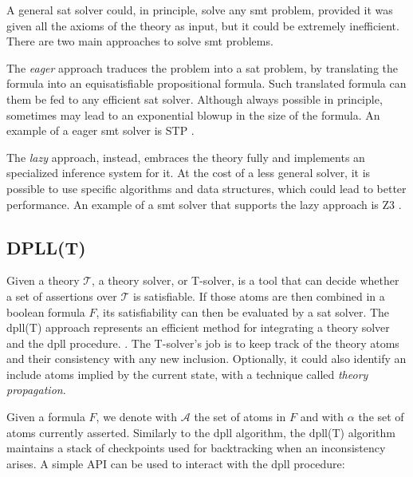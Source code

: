 A general \gls{sat} solver could, in principle, solve any \gls{smt} problem, provided it was given all the axioms of the theory as input, but it could be extremely inefficient.
There are two main approaches to solve \gls{smt} problems.

The \textit{eager} approach traduces the problem into a \gls{sat} problem, by translating the formula into an equisatisfiable propositional formula.
Such translated formula can them be fed to any efficient \gls{sat} solver.
Although always possible in principle, sometimes may lead to an exponential blowup in the size of the formula.
An example of a eager \gls{smt} solver is STP \cite{repo:stp}.

The \textit{lazy} approach, instead, embraces the theory fully and implements an specialized inference system for it.
At the cost of a less general solver, it is possible to use specific algorithms and data structures, which could lead to better performance.
An example of a \gls{smt} solver that supports the lazy approach is Z3 \cite{repo:z3}.

\subsection*{DPLL(T)}

Given a theory $\mathcal{T}$, a theory solver, or T-solver, is a tool that can decide whether a set of assertions over $\mathcal{T}$ is satisfiable.
If those atoms are then combined in a boolean formula $F$, its satisfiability can then be evaluated by a \gls{sat} solver.
The \gls{dpll}(T) approach represents an efficient method for integrating a theory solver and the \gls{dpll} procedure. \cite{paper:dpll-t}.
The T-solver's job is to keep track of the theory atoms and their consistency with any new inclusion.
Optionally, it could also identify an include atoms implied by the current state, with a technique called \textit{theory propagation}.

Given a formula $F$, we denote with $\mathcal{A}$ the set of atoms in $F$ and with $\alpha$ the set of atoms currently asserted.
Similarly to the \gls{dpll} algorithm, the \gls{dpll}(T) algorithm maintains a stack of checkpoints used for backtracking when an inconsistency arises.
A simple API can be used to interact with the \gls{dpll} procedure:

